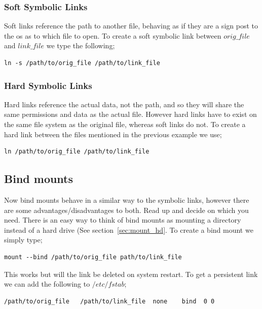 \subsubsection{Soft Symbolic Links}

Soft links reference the path to another file, behaving as if they are a sign post to the os as to which file to open.  To create a soft symbolic link between $orig\_file$ and $link\_file$ we type the following;

\begin{lstlisting}
ln -s /path/to/orig_file /path/to/link_file
\end{lstlisting}


\subsubsection{Hard Symbolic Links}

Hard links reference the actual data, not the path, and so they will share the same permissions and data as the actual file. However hard links have to exist on the same file system as the original file, whereas soft links do not. To create a hard link between the files mentioned in the previous example we use;

\begin{lstlisting}
ln /path/to/orig_file /path/to/link_file
\end{lstlisting}

\subsection{Bind mounts}

Now bind mounts behave in a similar way to the symbolic links, however there are some advantages/disadvantages to both. Read up and decide on which you need. There is an easy way to think of bind mounts as mounting a directory instead of a hard drive (See section~\ref{sec:mount_hd}. To create a bind mount we simply type;

\begin{lstlisting}
mount --bind /path/to/orig_file path/to/link_file
\end{lstlisting}

This works but will the link be deleted on system restart. To get a persistent link we can add the following to $/etc/fstab$;

\begin{lstlisting}
/path/to/orig_file   /path/to/link_file  none    bind  0 0
\end{lstlisting}

